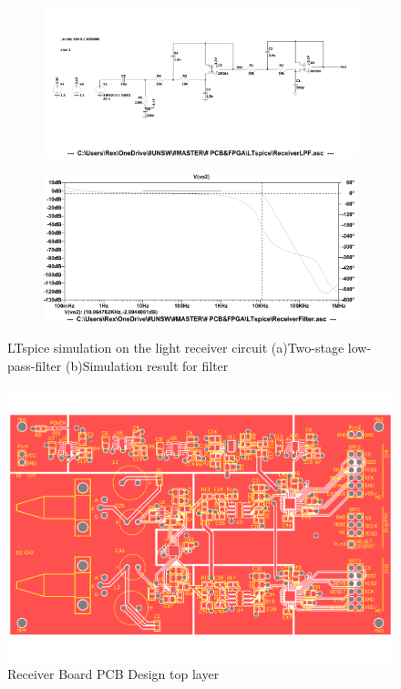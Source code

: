 \begin{figure}[H]
\centering
\begin{subfigure}{1\textwidth}
  \centering
  \includegraphics[width=1\linewidth]{4-ANC_Sys/LTspiceLPFSch.pdf}
  \caption{}
  \label{fig_LTspiceLPFSch}
\end{subfigure}
\begin{subfigure}{1\textwidth}
  \centering
  \includegraphics[width=1\linewidth]{4-ANC_Sys/LTspiceLPF.pdf}
  \caption{}
  \label{fig_LTspiceLPF}
\end{subfigure}
\caption{LTspice simulation on the light receiver circuit (a)Two-stage low-pass-filter (b)Simulation result for filter}
\label{fig_LTspiceSim2}
\end{figure}

\begin{figure}[H]
\centering
\includegraphics[width=0.9\linewidth]{4-ANC_Sys/PCB.pdf}
\caption{Receiver Board PCB Design top layer}
\label{fig_PCB}
\end{figure}

